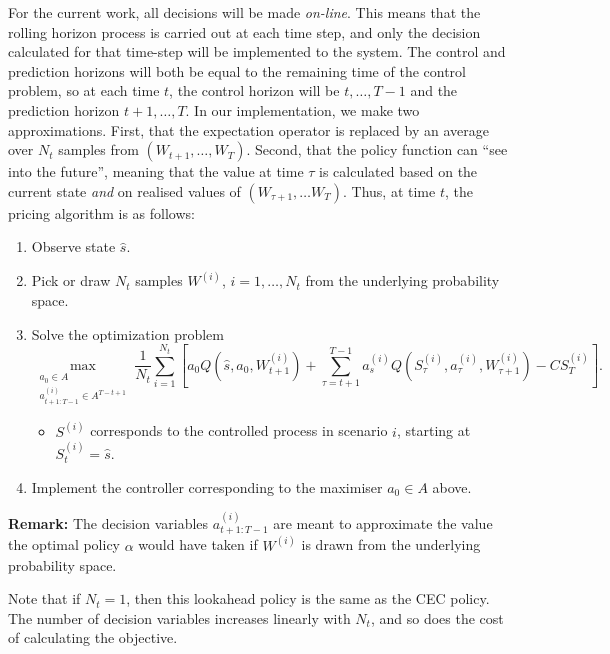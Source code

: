 \documentclass[main.tex]{subfiles}
\begin{document}
For the current work, all decisions will be made \emph{on-line}. This means
that the rolling horizon process is carried out at each time step, and
only the decision calculated for that time-step will be implemented to
the system. The control and prediction horizons will both be equal to
the remaining time of the control problem, so at each time $t$, the
control horizon will be $t,\dots,T-1$ and the prediction horizon
$t+1,\dots,T$.
In our implementation, we make two approximations.
First, that the expectation operator is replaced by
an average over $N_t$ samples from $(W_{t+1},\dots,W_T)$.
Second, that
the policy function can ``see into the future'', meaning that
the value at time $\tau$ is calculated based on
the current state \emph{and}  on realised values of $(W_{\tau+1},\dots W_{T})$.
Thus, at time $t$, the pricing algorithm is as follows:
\begin{enumerate}
\item Observe state $\hat s$.
\item Pick or draw $N_t$ samples $W^{(i)}$, $i=1,\dots,N_t$ from the
  underlying probability space.
\item Solve the optimization problem
  \begin{dmath}
    \max_{\substack{a_0\in A\\a_{t+1:T-1}^{(i)}\in A^{T-{t+1}}}}
    \frac{1}{N_t}\sum_{i=1}^{N_t}\left[
      a_0Q(\hat s,a_0,W_{t+1}^{(i)})
      +\sum_{\tau=t+1}^{T-1}a_s^{(i)}Q(S_\tau^{(i)},a_\tau^{(i)},W_{\tau+1}^{(i)})
      -C S_T^{(i)}\right].
  \end{dmath}
  \begin{itemize}
  \item $S^{(i)}$ corresponds to the
    controlled process in scenario $i$, starting at $S_t^{(i)}=\hat s$.
  \end{itemize}
\item Implement the controller corresponding to the maximiser $a_0\in
  A$ above.
\end{enumerate}
\textbf{Remark:} The decision variables $a_{t+1:T-1}^{(i)}$ are meant to
approximate the value the optimal policy $\alpha$ would have taken
if $W^{(i)}$ is drawn from the underlying probability space.

Note that if $N_t=1$, then this lookahead policy is the same as the CEC policy.
The number of decision variables increases linearly with $N_t$, and
so does the cost of calculating the objective.
\end{document}
